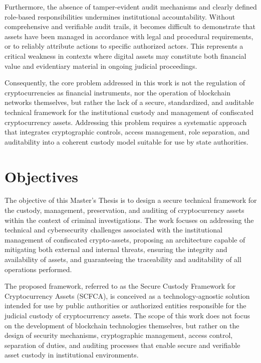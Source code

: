 \documentclass[12pt,a4paper]{report}
\begin{document}
Furthermore, the absence of tamper-evident audit mechanisms and clearly defined role-based responsibilities undermines institutional accountability. Without comprehensive and verifiable audit trails, it becomes difficult to demonstrate that assets have been managed in accordance with legal and procedural requirements, or to reliably attribute actions to specific authorized actors. This represents a critical weakness in contexts where digital assets may constitute both financial value and evidentiary material in ongoing judicial proceedings.

Consequently, the core problem addressed in this work is not the regulation of cryptocurrencies as financial instruments, nor the operation of blockchain networks themselves, but rather the lack of a secure, standardized, and auditable technical framework for the institutional custody and management of confiscated cryptocurrency assets. Addressing this problem requires a systematic approach that integrates cryptographic controls, access management, role separation, and auditability into a coherent custody model suitable for use by state authorities.


\section{Objectives}
The objective of this Master’s Thesis is to design a secure technical framework for the custody, management, preservation, and auditing of cryptocurrency assets within the context of criminal investigations. The work focuses on addressing the technical and cybersecurity challenges associated with the institutional management of confiscated crypto-assets, proposing an architecture capable of mitigating both external and internal threats, ensuring the integrity and availability of assets, and guaranteeing the traceability and auditability of all operations performed.

The proposed framework, referred to as the Secure Custody Framework for Cryptocurrency Assets (SCFCA), is conceived as a technology-agnostic solution intended for use by public authorities or authorized entities responsible for the judicial custody of cryptocurrency assets. The scope of this work does not focus on the development of blockchain technologies themselves, but rather on the design of security mechanisms, cryptographic management, access control, separation of duties, and auditing processes that enable secure and verifiable asset custody in institutional environments.
\end{document}
